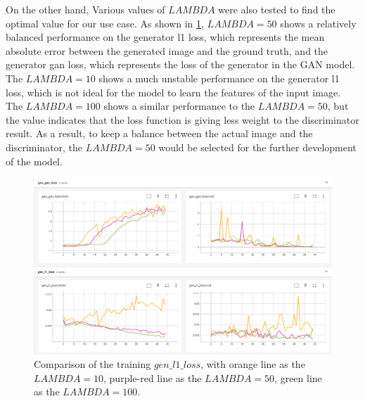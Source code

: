 \documentclass[10pt,twocolumn,letterpaper]{article}
\begin{document}
On the other hand, Various values of $LAMBDA$ were also tested to find the optimal value for our use case. As shown in \cref{fig:lambda}, $LAMBDA = 50$ shows a relatively balanced performance on 
the generator l1 loss, which represents the mean absolute error between the generated image and the ground truth, and the generator gan loss, which represents the loss of the generator in the GAN model.
The $LAMBDA = 10$ shows a much unstable performance on the generator l1 loss, which is not ideal for the model to learn the features of the input image. The $LAMBDA = 100$ shows a similar performance to the
$LAMBDA = 50$, but the value indicates that the loss function is giving less weight to the discriminator result. As a result, to keep a balance between the actual image and the discriminator, the $LAMBDA = 50$ 
would be selected for the further development of the model.

\begin{figure}[t]
    \centering
    \includegraphics[width=\linewidth]{figures/milestone/lambda.png}
    \caption{Comparison of the training $gen\_l1\_loss$, with orange line as the $LAMBDA = 10$, purple-red line as the $LAMBDA = 50$, green line as the $LAMBDA = 100$.}
    \label{fig:lambda}
\end{figure}
\end{document}
